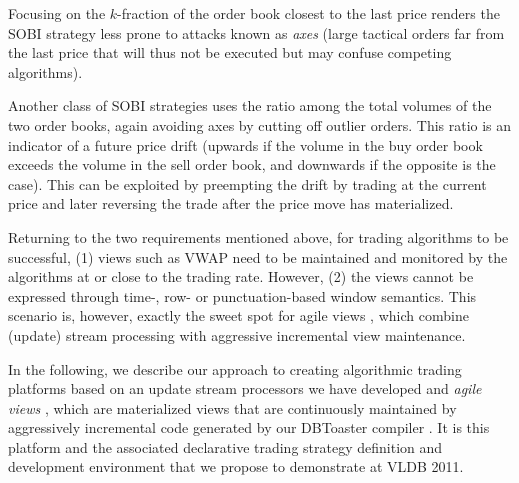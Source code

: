 \begin{example}
Focusing on the $k$-fraction of the order book closest to the last price
renders the SOBI strategy less prone to attacks known as {\em axes}\/ (large
tactical orders far from the last price that will thus not be executed but
may confuse competing algorithms).

Another class of SOBI strategies uses the ratio
among the total volumes of the two order books, again avoiding axes by cutting off
outlier orders. This ratio is an indicator of a future price drift (upwards if
the volume in the buy order book exceeds the volume in the sell order book,
and downwards if the opposite is the case). This can be exploited by preempting
the drift by trading at the current price and later reversing the trade after the price move has materialized.
\punto
\end{example}


Returning to the two requirements mentioned above,
for trading algorithms to be successful, (1)
views such as VWAP need to be maintained and monitored by the algorithms at or
close to the trading rate. However, (2) the views cannot be expressed through
time-, row- or punctuation-based window semantics.
This scenario is, however, exactly the sweet spot for agile views
\cite{KAK2011}, which combine (update) stream processing with aggressive
incremental view maintenance.

In the following, we describe our approach to creating algorithmic
trading platforms based on an update stream processors we have developed and
{\em agile views}\/ \cite{KAK2011}, which are materialized views
that are continuously maintained by aggressively incremental code generated
by our DBToaster compiler \cite{ahmad-vldb:09,koch-pods:10,KAK2011}.
It is this platform and the
associated declarative trading strategy definition and development environment
that we propose to demonstrate at VLDB 2011.


